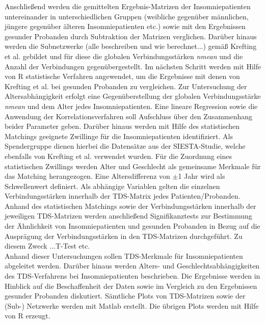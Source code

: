 Anschließend werden die gemittelten Ergebnis-Matrizen der Insomniepatienten untereinander in unterschiedlichen Gruppen (weibliche gegenüber männlichen, jüngere gegenüber älteren Insomniepatienten etc.) sowie mit den Ergebnissen gesunder Probanden durch Subtraktion der Matrizen verglichen. Darüber hinaus werden die Subnetzwerke (alle beschreiben und wie berechnet...) gemäß Krefting et al. gebildet und für diese die globalen Verbindungsstärken \textit{nmean} und die Anzahl der Verbindungen gegenübergestellt. Im nächsten Schritt werden mit Hilfe von R statistische Verfahren angewendet, um die Ergebnisse mit denen von Krefting et al. bei gesunden Probanden zu vergleichen. Zur Untersuchung der Altersabhängigkeit erfolgt eine Gegenüberstellung der globalen Verbindungsstärke \textit{nmean} und dem Alter jedes Insomniepatienten. Eine lineare Regression sowie die Anwendung der Korrelationsverfahren soll Aufschluss über den Zusammenhang beider Parameter geben. Darüber hinaus werden mit Hilfe des statistischen Matchings geeignete Zwillinge für die Insomniepatienten identifiziert. Als Spendergruppe dienen hierbei die Datensätze aus der SIESTA-Studie, welche ebenfalls von Krefting et al. verwendet wurden. Für die Zuordnung eines statistischen Zwillings werden Alter und Geschlecht als gemeinsame Merkmale für das Matching herangezogen. Eine Altersdifferenz von $\pm$1 Jahr wird als Schwellenwert definiert. Als abhängige Variablen gelten die einzelnen Verbindungsstärken innerhalb der \acs{TDS}-Matrix jedes Patienten/Probanden. Anhand des statistischen Matchings sowie der Verbindungsstärken innerhalb der jeweiligen \acs{TDS}-Matrizen werden anschließend Signifikanztests zur Bestimmung der Ähnlichkeit von Insomniepatienten und gesunden Probanden in Bezug auf die Ausprägung der Verbindungsstärken in den \acs{TDS}-Matrizen durchgeführt. Zu diesem Zweck ...T-Test etc. \\

Anhand dieser Untersuchungen sollen \acs{TDS}-Merkmale für Insomniepatienten abgeleitet werden. Darüber hinaus werden Alters- und Geschlechtsabhängigkeiten des \acs{TDS}-Verfahrens bei Insomniepatienten beschrieben. Die Ergebnisse werden in Hinblick auf die Beschaffenheit der Daten sowie im Vergleich zu den Ergebnissen gesunder Probanden diskutiert. Sämtliche Plots von \acs{TDS}-Matrizen sowie der (Sub-) Netzwerke werden mit Matlab erstellt. Die übrigen Plots werden mit Hilfe von R erzeugt.


